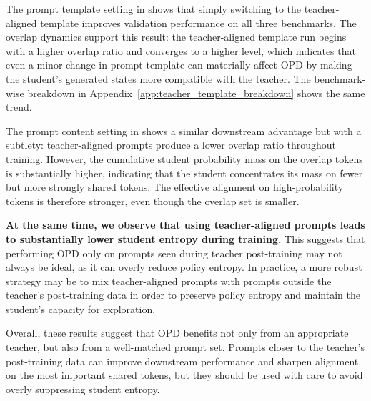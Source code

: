 The prompt template setting in  shows that simply switching to the teacher-aligned template improves validation performance on all three benchmarks.
The overlap dynamics support this result: the teacher-aligned template run begins with a higher overlap ratio and converges to a higher level, which indicates that even a minor change in prompt template can materially affect OPD by making the student's generated states more compatible with the teacher.
The benchmark-wise breakdown in Appendix~\ref{app:teacher_template_breakdown} shows the same trend.


The prompt content setting in  shows a similar downstream advantage but with a subtlety: teacher-aligned prompts produce a lower overlap ratio throughout training. However, the cumulative student probability mass on the overlap tokens is substantially higher, indicating that the student concentrates its mass on fewer but more strongly shared tokens.
The effective alignment on high-probability tokens is therefore stronger, even though the overlap set is smaller.




\textbf{At the same time, we observe that using teacher-aligned prompts leads to substantially lower student entropy during training.}
This suggests that performing OPD only on prompts seen during teacher post-training may not always be ideal, as it can overly reduce policy entropy.
In practice, a more robust strategy may be to mix teacher-aligned prompts with prompts outside the teacher’s post-training data in order to preserve policy entropy and maintain the student’s capacity for exploration.

Overall, these results suggest that OPD benefits not only from an appropriate teacher, but also from a well-matched prompt set. Prompts closer to the teacher's post-training data can improve downstream performance and sharpen alignment on the most important shared tokens, but they should be used with care to avoid overly suppressing student entropy.
